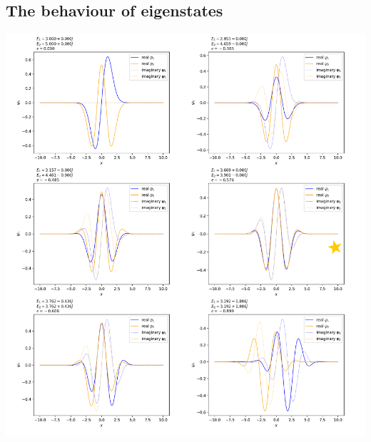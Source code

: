 \documentclass[10pt, a4paper, singlespacing]{report}
\newenvironment{Figure}
    {\par\medskip\noindent\minipage{\linewidth}}
    {\endminipage\par\medskip}
\begin{document}
\subsection{The behaviour of eigenstates}\label{Eigenstates}

\begin{Figure}
 \centering
 \hspace*{-0.9cm}
 \includegraphics[width=1.1\linewidth]{eigenstates.pdf}

\end{Figure}
\end{document}
